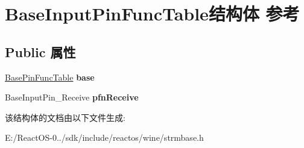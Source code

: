 \hypertarget{struct_base_input_pin_func_table}{}\section{Base\+Input\+Pin\+Func\+Table结构体 参考}
\label{struct_base_input_pin_func_table}
\subsection*{Public 属性}
\begin{DoxyCompactItemize}
\item 
\mbox{\label{struct_base_input_pin_func_table_a642ea23b9b245d21ae29d665ff2641eb}} 
\hyperlink{struct_base_pin_func_table}{Base\+Pin\+Func\+Table} {\bfseries base}
\item 
\mbox{\label{struct_base_input_pin_func_table_af510c6ee7332bc3b0a93a0f57808da76}} 
Base\+Input\+Pin\+\_\+\+Receive {\bfseries pfn\+Receive}
\end{DoxyCompactItemize}


该结构体的文档由以下文件生成\+:\begin{DoxyCompactItemize}
\item 
E\+:/\+React\+O\+S-\/0../sdk/include/reactos/wine/strmbase.\+h\end{DoxyCompactItemize}

